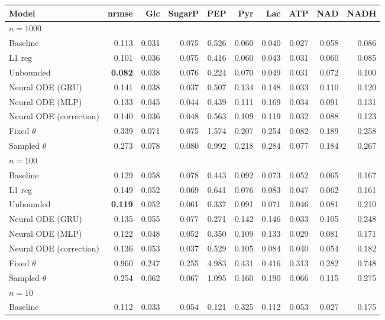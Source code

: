 \begin{tabular}{lrrrrrrrrr}
\toprule
Model & nrmse & Glc & SugarP & PEP & Pyr & Lac & ATP & NAD & NADH \\
\midrule
\multicolumn{10}{l}{\textbf{$n=1000$}} \\
Baseline & 0.113 & 0.031 & 0.075 & 0.526 & 0.060 & 0.040 & 0.027 & 0.058 & 0.086 \\
L1 reg & 0.101 & 0.036 & 0.075 & 0.416 & 0.060 & 0.043 & 0.031 & 0.060 & 0.085 \\
Unbounded & \textbf{0.082} & 0.038 & 0.076 & 0.224 & 0.070 & 0.049 & 0.031 & 0.072 & 0.100 \\
Neural ODE (GRU) & 0.141 & 0.038 & 0.037 & 0.507 & 0.134 & 0.148 & 0.033 & 0.110 & 0.120 \\
Neural ODE (MLP) & 0.133 & 0.045 & 0.044 & 0.439 & 0.111 & 0.169 & 0.034 & 0.091 & 0.131 \\
Neural ODE (correction) & 0.140 & 0.036 & 0.048 & 0.563 & 0.109 & 0.119 & 0.032 & 0.088 & 0.123 \\
Fixed $\theta$ & 0.339 & 0.071 & 0.075 & 1.574 & 0.207 & 0.254 & 0.082 & 0.189 & 0.258 \\
Sampled $\theta$ & 0.273 & 0.078 & 0.080 & 0.992 & 0.218 & 0.284 & 0.077 & 0.184 & 0.267 \\
\midrule
\multicolumn{10}{l}{\textbf{$n=100$}} \\
Baseline & 0.129 & 0.058 & 0.078 & 0.443 & 0.092 & 0.073 & 0.052 & 0.065 & 0.167 \\
L1 reg & 0.149 & 0.052 & 0.069 & 0.641 & 0.076 & 0.083 & 0.047 & 0.062 & 0.161 \\
Unbounded & \textbf{0.119} & 0.052 & 0.061 & 0.337 & 0.091 & 0.071 & 0.046 & 0.081 & 0.210 \\
Neural ODE (GRU) & 0.135 & 0.055 & 0.077 & 0.271 & 0.142 & 0.146 & 0.033 & 0.105 & 0.248 \\
Neural ODE (MLP) & 0.122 & 0.048 & 0.052 & 0.350 & 0.109 & 0.133 & 0.029 & 0.081 & 0.171 \\
Neural ODE (correction) & 0.136 & 0.053 & 0.037 & 0.529 & 0.105 & 0.084 & 0.040 & 0.054 & 0.182 \\
Fixed $\theta$ & 0.960 & 0.247 & 0.255 & 4.983 & 0.431 & 0.416 & 0.313 & 0.282 & 0.748 \\
Sampled $\theta$ & 0.254 & 0.062 & 0.067 & 1.095 & 0.160 & 0.190 & 0.066 & 0.115 & 0.275 \\
\midrule
\multicolumn{10}{l}{\textbf{$n=10$}} \\
Baseline & 0.112 & 0.033 & 0.054 & 0.121 & 0.325 & 0.112 & 0.053 & 0.027 & 0.175 \\

\end{tabular}
